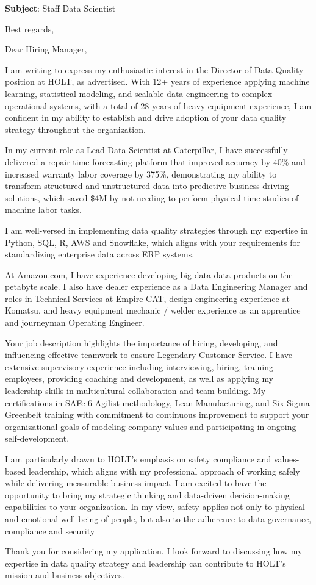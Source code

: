 \documentclass[10pt, letterpaper, sans]{moderncv}
\newcommand{\subject}{Staff Data Scientist}
\begin{document}
\date{\today}
\opening{\textbf{Subject}: \subject}
\closing{Best regards,}
\makelettertitle

\vspace{0.25cm}

Dear Hiring Manager,

I am writing to express my enthusiastic interest in the Director of Data Quality position at HOLT, as advertised. With 12+ years of experience applying machine learning, statistical modeling, and scalable data engineering to complex operational systems, with a total of 28 years of heavy equipment experience, I am confident in my ability to establish and drive adoption of your data quality strategy throughout the organization.

In my current role as Lead Data Scientist at Caterpillar, I have successfully delivered a repair time forecasting platform that improved accuracy by 40\% and increased warranty labor coverage by 375\%, demonstrating my ability to transform structured and unstructured data into predictive business-driving solutions, which saved \$4M by not needing to perform physical time studies of machine labor tasks.

I am well-versed in implementing data quality strategies through my expertise in Python, SQL, R, AWS and Snowflake, which aligns with your requirements for standardizing enterprise data across ERP systems.

At Amazon.com, I have experience developing big data data products on the petabyte scale. I also have dealer experience as a Data Engineering Manager and roles in Technical Services at Empire-CAT, design engineering experience at Komatsu, and heavy equipment mechanic / welder experience as an apprentice and journeyman Operating Engineer.

Your job description highlights the importance of hiring, developing, and influencing effective teamwork to ensure Legendary Customer Service. I have extensive supervisory experience including interviewing, hiring, training employees, providing coaching and development, as well as applying my leadership skills in multicultural collaboration and team building. My certifications in SAFe 6 Agilist methodology, Lean Manufacturing, and Six Sigma Greenbelt training with commitment to continuous improvement to support your organizational goals of modeling company values and participating in ongoing self-development.

I am particularly drawn to HOLT's emphasis on safety compliance and values-based leadership, which aligns with my professional approach of working safely while delivering measurable business impact. I am excited to have the opportunity to bring my strategic thinking and data-driven decision-making capabilities to your organization. In my view, safety applies not only to physical and emotional well-being of people, but also to the adherence to data governance, compliance and security 

Thank you for considering my application. I look forward to discussing how my expertise in data quality strategy and leadership can contribute to HOLT's mission and business objectives.

\hspace{8pt}

\makeletterclosing
\end{document}
